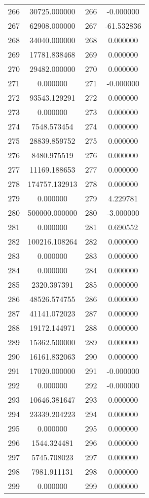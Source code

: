 \documentclass[12pt]{article}
\begin{document}
\begin{longtable}{@{}cccc@{}}
266 & 30725.000000 & 266 & -0.000000 \\
267 & 62908.000000 & 267 & -61.532836 \\
268 & 34040.000000 & 268 & 0.000000 \\
269 & 17781.838468 & 269 & 0.000000 \\
270 & 29482.000000 & 270 & 0.000000 \\
271 & 0.000000 & 271 & -0.000000 \\
272 & 93543.129291 & 272 & 0.000000 \\
273 & 0.000000 & 273 & 0.000000 \\
274 & 7548.573454 & 274 & 0.000000 \\
275 & 28839.859752 & 275 & 0.000000 \\
276 & 8480.975519 & 276 & 0.000000 \\
277 & 11169.188653 & 277 & 0.000000 \\
278 & 174757.132913 & 278 & 0.000000 \\
279 & 0.000000 & 279 & 4.229781 \\
280 & 500000.000000 & 280 & -3.000000 \\
281 & 0.000000 & 281 & 0.690552 \\
282 & 100216.108264 & 282 & 0.000000 \\
283 & 0.000000 & 283 & 0.000000 \\
284 & 0.000000 & 284 & 0.000000 \\
285 & 2320.397391 & 285 & 0.000000 \\
286 & 48526.574755 & 286 & 0.000000 \\
287 & 41141.072023 & 287 & 0.000000 \\
288 & 19172.144971 & 288 & 0.000000 \\
289 & 15362.500000 & 289 & 0.000000 \\
290 & 16161.832063 & 290 & 0.000000 \\
291 & 17020.000000 & 291 & -0.000000 \\
292 & 0.000000 & 292 & -0.000000 \\
293 & 10646.381647 & 293 & 0.000000 \\
294 & 23339.204223 & 294 & 0.000000 \\
295 & 0.000000 & 295 & 0.000000 \\
296 & 1544.324481 & 296 & 0.000000 \\
297 & 5745.708023 & 297 & 0.000000 \\
298 & 7981.911131 & 298 & 0.000000 \\
299 & 0.000000 & 299 & 0.000000 \\

\end{longtable}
\end{document}
